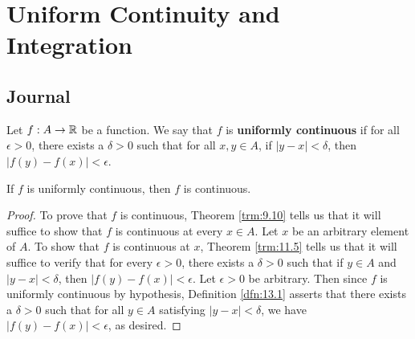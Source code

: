 \documentclass[../main.tex]{subfiles}
\begin{document}
\chapter{Uniform Continuity and Integration}\label{sct:13}
\section{Journal}
\begin{definition}\label{dfn:13.1}
    Let $f:A\to\mathbb{R}$ be a function. We say that $f$ is \textbf{uniformly continuous} if for all $\epsilon>0$, there exists a $\delta>0$ such that for all $x,y\in A$, if $|y-x|<\delta$, then $|f(y)-f(x)|<\epsilon$.
\end{definition}

\begin{theorem}\label{trm:13.2}
    If $f$ is uniformly continuous, then $f$ is continuous.
    \begin{proof}
        To prove that $f$ is continuous, Theorem \ref{trm:9.10} tells us that it will suffice to show that $f$ is continuous at every $x\in A$. Let $x$ be an arbitrary element of $A$. To show that $f$ is continuous at $x$, Theorem \ref{trm:11.5} tells us that it will suffice to verify that for every $\epsilon>0$, there exists a $\delta>0$ such that if $y\in A$ and $|y-x|<\delta$, then $|f(y)-f(x)|<\epsilon$. Let $\epsilon>0$ be arbitrary. Then since $f$ is uniformly continuous by hypothesis, Definition \ref{dfn:13.1} asserts that there exists a $\delta>0$ such that for all $y\in A$ satisfying $|y-x|<\delta$, we have $|f(y)-f(x)|<\epsilon$, as desired.
    \end{proof}
\end{theorem}
\end{document}
